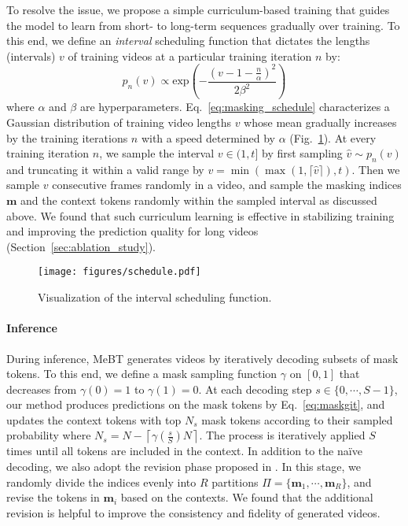 \documentclass[10pt,twocolumn,letterpaper]{article}
\begin{document}
To resolve the issue, we propose a simple curriculum-based training that guides the model to learn from short- to long-term sequences gradually over training. 
To this end, we define an \emph{interval} scheduling function that dictates the lengths (intervals) $v$ of training videos at a particular training iteration $n$ by:
\begin{equation}
    p_n(v) \propto \text{exp}\left( - \frac{(v-1 - \frac{n}{\alpha})^2}{2\beta^2} \right)
    \label{eq:masking_schedule}
\end{equation}
where $\alpha$ and $\beta$ are hyperparameters. 
Eq.~\eqref{eq:masking_schedule} characterizes a Gaussian distribution of training video lengths $v$ whose mean gradually increases by the training iterations $n$ with a speed determined by $\alpha$ (Fig.~\ref{fig:video_schedule}).
At every training iteration $n$, we sample the interval $v\in(1,t]$ by first sampling $\hat{v}\sim p_n(v)$ and truncating it within a valid range by $v=\min(\max(1,\lceil\hat{v}\rceil),t)$. 
Then we sample $v$ consecutive frames randomly in a video, and sample the masking indices $\mathbf{m}$ and the context tokens randomly within the sampled interval as discussed above.
We found that such curriculum learning is effective in stabilizing training and improving the prediction quality for long videos (Section~\ref{sec:ablation_study}).

\begin{figure}
    \centering
    \texttt{[image: figures/schedule.pdf]}
    \vspace{-0.2cm}
    \caption{Visualization of the interval scheduling function. 
    }
    \label{fig:video_schedule}
    \vspace{-0.7cm}
\end{figure}



\vspace{-0.2cm}
\paragraph{Inference} 
During inference, MeBT generates videos by iteratively decoding subsets of mask tokens.
To this end, we define a mask sampling function $\gamma$ on $[0, 1]$ that decreases from $\gamma(0) = 1$ to $\gamma(1) = 0$.
At each decoding step $s \in \{0, \cdots, S-1\}$, our method produces predictions on the mask tokens by Eq.~\eqref{eq:maskgit}, and updates the context tokens with top $N_s$ mask tokens according to their sampled probability where $N_s = N - \left \lceil \gamma(\frac{s}{S}) N \right \rceil$.
The process is iteratively applied $S$ times until all tokens are included in the context.
In addition to the na\"ive decoding, we also adopt the revision phase proposed in \cite{draft_and_revise}. 
In this stage, we randomly divide the indices evenly into $R$ partitions $\Pi = \{\mathbf{m}_1, \cdots, \mathbf{m}_R\}$, and revise the tokens in $\mathbf{m}_i$ based on the contexts. 
We found that the additional revision is helpful to improve the consistency and fidelity of generated videos.
\end{document}
